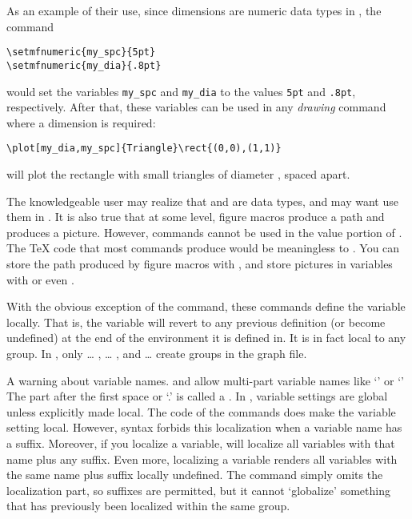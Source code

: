 \documentclass[letterpaper]{article}
\begin{document}
As an example of their use, since dimensions are numeric data types in
\MF{}, the command
\begin{verbatim}
\setmfnumeric{my_spc}{5pt}
\setmfnumeric{my_dia}{.8pt}
\end{verbatim}
would set the \MF{} variables \verb$my_spc$ and \verb$my_dia$ to the
values \texttt{5pt} and \texttt{.8pt}, respectively. After that, these
variables can be used in any \emph{drawing} command where a dimension is
required:
\begin{verbatim}
\plot[my_dia,my_spc]{Triangle}\rect{(0,0),(1,1)}
\end{verbatim}
will plot the rectangle with small triangles of diameter \dim{.8pt},
spaced \dim{5pt} apart.

The knowledgeable user may realize that  and  are
\MF{} data types, and may want use them in . It is
also true that at some level, \mfp{} figure macros produce a path and
 produces a picture. However, \mfp{} commands cannot be
used in the value portion of . The \TeX{} code that
most \mfp{} commands produce would be meaningless to \MF{}. You can
store the path produced by figure macros with , and store
pictures in variables with  or even .

With the obvious exception of the  command, these
commands define the variable locally. That is, the variable will revert
to any previous definition (or become undefined) at the end of the
 environment it is defined in. It is in fact local to any
\MF{} group. In \mfp{}, only  {\dots} ,
 {\dots} , and  {\dots}
 create \MF{} groups in the graph file.

A warning about variable names. \CMF{} and \MP{} allow multi-part
variable names like `' or `' The part
after the first space or `.' is called a . In \MF{},
variable settings are global unless explicitly made local. The code of
the  commands does make the variable setting local. However,
\MF{} syntax forbids this localization when a variable name has a
suffix. Moreover, if you localize a variable, \MF{} will localize all
variables with that name plus any suffix. Even more, localizing a
variable renders all variables with the same name plus suffix locally
undefined. The command  simply omits the
localization part, so suffixes are permitted, but it cannot `globalize'
something that has previously been localized within the same group.
\end{document}
